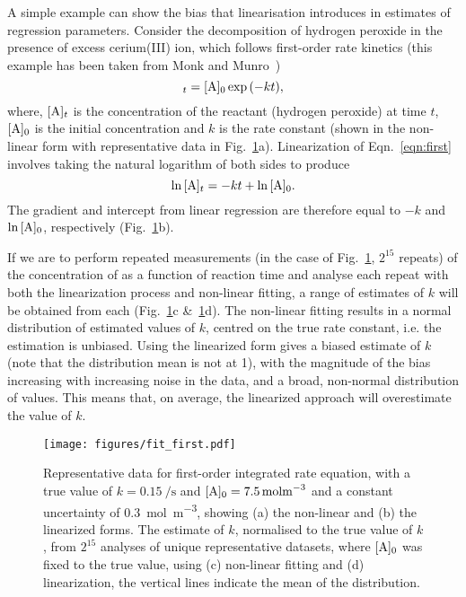 \documentclass[journal=jacsat,manuscript=article]{achemso}
\begin{document}
A simple example can show the bias that linearisation introduces in estimates of regression parameters. 
Consider the decomposition of hydrogen peroxide  in the presence of excess cerium(III) ion, which follows first-order rate kinetics (this example has been taken from Monk and Munro~\cite{monk_math_2010})
%
\begin{equation}
    [\ce{A}]_t = [\ce{A}]_0\exp{(-kt)},
    \label{eqn:first}
\end{equation}
%
where, $[\ce{A}]_t$ is the concentration of the reactant  (hydrogen peroxide) at time $t$, $[\ce{A}]_0$ is the initial concentration and $k$ is the rate constant (shown in the non-linear form with representative data in Fig.~\ref{fig:fit_first}a).
Linearization of Eqn.~\ref{eqn:first} involves taking the natural logarithm of both sides to produce
%
\begin{equation}
    \ln{[\ce{A}]_t} = -kt + \ln{[\ce{A}]_0}.
\end{equation}
%
The gradient and intercept from linear regression are therefore equal to $-k$ and $\ln{[\ce{A}]_0}$, respectively (Fig.~\ref{fig:fit_first}b).

If we are to perform repeated measurements (in the case of Fig.~\ref{fig:fit_first}, $2^{15}$ repeats) of the concentration of  as a function of reaction time and analyse each repeat with both the linearization process and non-linear fitting, a range of estimates of $k$ will be obtained from each (Fig.~\ref{fig:fit_first}c \&~\ref{fig:fit_first}d).
The non-linear fitting results in a normal distribution of estimated values of $k$, centred on the true rate constant, i.e. the estimation is unbiased. 
Using the linearized form gives a biased estimate of $k$ (note that the distribution mean is not at \num{1}), with the magnitude of the bias increasing with increasing noise in the data, and a broad, non-normal distribution of values. 
This means that, on average, the linearized approach will overestimate the value of $k$. 
%
\begin{figure}
  \texttt{[image: figures/fit\_first.pdf]}
  \caption{
    Representative data for first-order integrated rate equation, with a true value of $k=\SI{0.15}{\per\second}$ and $[\ce{A}]_0=\SI{7.5}{\mol\m^{-3}}$ and a constant uncertainty of \SI{0.3}{\mol\m^{-3}}, showing (a) the non-linear and (b) the linearized forms. 
    The estimate of $k$, normalised to the true value of $k$, from $2^{15}$ analyses of unique representative datasets, where $[\ce{A}]_0$ was fixed to the true value, using (c) non-linear fitting and (d) linearization, the vertical lines indicate the mean of the distribution. 
    }
  \label{fig:fit_first}
\end{figure}
%
\end{document}

